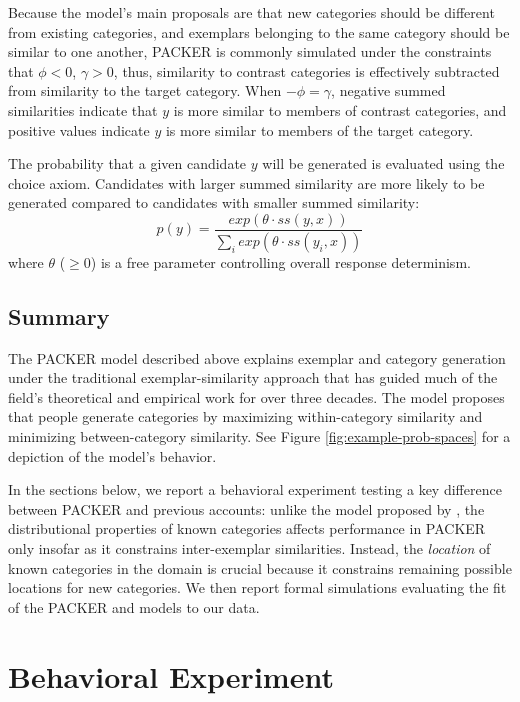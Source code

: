 \documentclass[10pt,letterpaper]{article}
\begin{document}
Because the model's main proposals are that new categories should be different from existing categories, and exemplars belonging to the same category should be similar to one another, PACKER is commonly simulated under the constraints that $\phi < 0$, $\gamma > 0$, thus, similarity to contrast categories is effectively subtracted from similarity to the target category. When $-\phi = \gamma$, negative summed similarities indicate that $y$ is more similar to members of contrast categories, and positive values indicate $y$ is more similar to members of the target category.

The probability that a given candidate $y$ will be generated is evaluated using the \citet{luce1977choice} choice axiom. Candidates with larger summed similarity are more likely to be generated compared to candidates with smaller summed similarity:
\begin{equation}
p(y) = \dfrac
    { exp( { \theta \cdot ss(y, x) } ) }
    { \sum_i{ exp( { \theta \cdot ss(y_i, x) } ) } }
\end{equation}
where $\theta$ ($\geq 0$) is a free parameter controlling overall response determinism. 

\subsection{Summary}

The PACKER model described above explains exemplar and category generation under the traditional exemplar-similarity approach that has guided much of the field's theoretical and empirical work for over three decades. The model proposes that people generate categories by maximizing within-category similarity and minimizing between-category similarity. See Figure \ref{fig:example-prob-spaces} for a depiction of the model's behavior.

In the sections below, we report a behavioral experiment testing a key difference between PACKER and previous accounts: unlike the model proposed by \citeauthor{jern2013probabilistic}, the distributional properties of known categories affects performance in PACKER only insofar as it constrains inter-exemplar similarities. Instead, the \textit{location} of known categories in the domain is crucial because it constrains remaining possible locations for new categories. We then report formal simulations evaluating the fit of the PACKER and \citet{jern2013probabilistic} models to our data.

\section{Behavioral Experiment}
\end{document}
